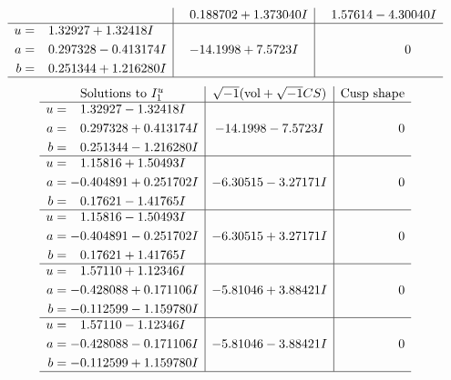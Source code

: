 \documentclass[1p]{elsarticle_modified}
\theoremstyle{definition}
\newcommand{\I}{\sqrt{-1}}
\begin{document}
$$\begin{array}{c|c|c}
 & \phantom{-}0.188702 + 1.373040 I & \phantom{-}1.57614 - 4.30040 I \\ \hline\begin{aligned}
u &= \phantom{-}1.32927 + 1.32418 I \\
a &= \phantom{-}0.297328 - 0.413174 I \\
b &= \phantom{-}0.251344 + 1.216280 I\end{aligned}
 & -14.1998 + 7.5723 I & \phantom{-0.000000 } 0\\
 \hline 
 \end{array}$$\newpage$$\begin{array}{c|c|c}  
\text{Solutions to }I^u_{1}& \I (\text{vol} + \sqrt{-1}CS) & \text{Cusp shape}\\
 \hline 
\begin{aligned}
u &= \phantom{-}1.32927 - 1.32418 I \\
a &= \phantom{-}0.297328 + 0.413174 I \\
b &= \phantom{-}0.251344 - 1.216280 I\end{aligned}
 & -14.1998 - 7.5723 I & \phantom{-0.000000 } 0 \\ \hline\begin{aligned}
u &= \phantom{-}1.15816 + 1.50493 I \\
a &= -0.404891 + 0.251702 I \\
b &= \phantom{-}0.17621 - 1.41765 I\end{aligned}
 & -6.30515 - 3.27171 I & \phantom{-0.000000 } 0 \\ \hline\begin{aligned}
u &= \phantom{-}1.15816 - 1.50493 I \\
a &= -0.404891 - 0.251702 I \\
b &= \phantom{-}0.17621 + 1.41765 I\end{aligned}
 & -6.30515 + 3.27171 I & \phantom{-0.000000 } 0 \\ \hline\begin{aligned}
u &= \phantom{-}1.57110 + 1.12346 I \\
a &= -0.428088 + 0.171106 I \\
b &= -0.112599 - 1.159780 I\end{aligned}
 & -5.81046 + 3.88421 I & \phantom{-0.000000 } 0 \\ \hline\begin{aligned}
u &= \phantom{-}1.57110 - 1.12346 I \\
a &= -0.428088 - 0.171106 I \\
b &= -0.112599 + 1.159780 I\end{aligned}
 & -5.81046 - 3.88421 I & \phantom{-0.000000 } 0\\
 \hline 
 \end{array}$$\newpage\newpage\renewcommand{\arraystretch}{1}
\end{document}
